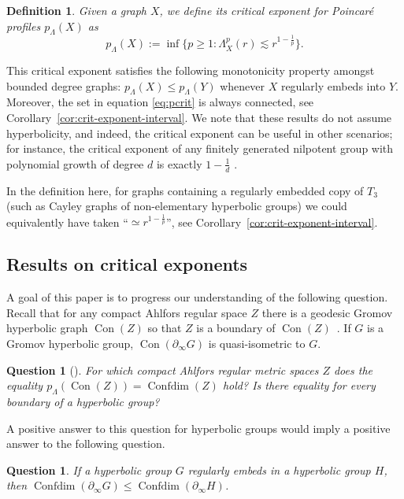 \documentclass[11pt]{amsart}
\numberwithin{equation}{section}
\newtheorem{question}[equation]{Question}
\newtheorem{definition}[equation]{Definition}
\theoremstyle{citing}
\DeclareMathOperator{\Cone}{Con}
\DeclareMathOperator{\Confdim}{Confdim}
\newcommand{\bdry}{\partial_\infty}
\newcommand{\pcrit}{p_{\Lambda}}
\numberwithin{equation}{section}
\begin{document}
\begin{definition}\label{def:profile-crit}
	Given a graph $X$, we define its \emph{critical exponent for Poincar\'e profiles} $\pcrit(X)$ as  
\begin{equation}\label{eq:pcrit}
    \pcrit(X) := \inf \{ p \geq 1 : \Lambda^p_X(r) \lesssim r^{1-\frac{1}{p}} \}.
\end{equation}
\end{definition}
This critical exponent satisfies the following monotonicity property amongst bounded degree graphs: $\pcrit(X) \leq \pcrit(Y)$ whenever $X$ regularly embeds into $Y$.  Moreover, the set in equation \eqref{eq:pcrit} is always connected, see Corollary~\ref{cor:crit-exponent-interval}. We note that these results do not assume hyperbolicity, and indeed, the critical exponent can be useful in other scenarios; for instance, the critical exponent of any finitely generated nilpotent group with polynomial growth of degree $d$ is exactly $1-\frac1d$ \cite{HumeMackTess-Pprof}.

In the definition here, for graphs containing a regularly embedded copy of $T_3$ (such as Cayley graphs of non-elementary hyperbolic groups) we could equivalently have taken ``$\simeq r^{1-\frac{1}{p}}$'', see Corollary~\ref{cor:crit-exponent-interval}.

\subsection{Results on critical exponents}
A goal of this paper is to progress our understanding of the following question.  Recall that for any compact Ahlfors regular space $Z$ there is a geodesic Gromov hyperbolic graph $\Cone(Z)$ so that $Z$ is a boundary of $\Cone(Z)$~\cite{BonkSchramm}.  If $G$ is a Gromov hyperbolic group, $\Cone(\bdry G)$ is quasi-isometric to $G$.

\begin{question}[{\cite[Question 8.6]{HumeMackTess-PprofLie}}]\label{quequality}
    For which compact Ahlfors regular metric spaces $Z$ does the equality $\pcrit(\Cone(Z)) = \Confdim(Z)$ hold?  Is there equality for every boundary of a hyperbolic group?
\end{question}
A positive answer to this question for hyperbolic groups would imply a positive answer to the following question.
\begin{question}\label{qu:regmap-confdim-monotone}
If a hyperbolic group $G$ regularly embeds in a hyperbolic group $H$, then $\Confdim(\bdry G) \leq \Confdim(\bdry H)$.	
\end{question}
\end{document}
